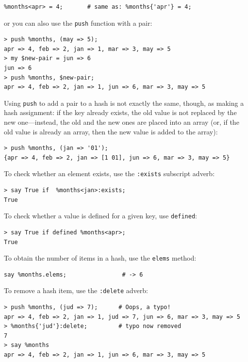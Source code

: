 \begin{verbatim}
%months<apr> = 4;       # same as: %months{'apr'} = 4;
\end{verbatim}

or you can also use the {\tt push} function with a pair:

\begin{verbatim}
> push %months, (may => 5);
apr => 4, feb => 2, jan => 1, mar => 3, may => 5
> my $new-pair = jun => 6
jun => 6
> push %months, $new-pair;
apr => 4, feb => 2, jan => 1, jun => 6, mar => 3, may => 5
\end{verbatim}
%

Using {\tt push} to add a pair to a hash is not exactly the same, 
though, as making a hash assignment: if the key already 
exists, the old value is not replaced by the new one---instead,  
the old and the new ones are placed into an array (or, 
if the old value is already an array, then the new value 
is added to the array):

\begin{verbatim}
> push %months, (jan => '01');
{apr => 4, feb => 2, jan => [1 01], jun => 6, mar => 3, may => 5}
\end{verbatim}

To check whether an element exists, use the {\tt :exists} 
subscript adverb:
\begin{verbatim}
> say True if  %months<jan>:exists;
True
\end{verbatim}

To check whether a value is defined for a given key, 
use {\tt defined}:

\begin{verbatim}
> say True if defined %months<apr>;
True
\end{verbatim}
%

To obtain the number of items in a hash, use the {\tt elems}
method:

\begin{verbatim}
say %months.elems;                # -> 6
\end{verbatim}

To remove a hash item, use the {\tt :delete} adverb:

\begin{verbatim}
> push %months, (jud => 7);      # Oops, a typo!
apr => 4, feb => 2, jan => 1, jud => 7, jun => 6, mar => 3, may => 5
> %months{'jud'}:delete;         # typo now removed
7
> say %months
apr => 4, feb => 2, jan => 1, jun => 6, mar => 3, may => 5
\end{verbatim}

